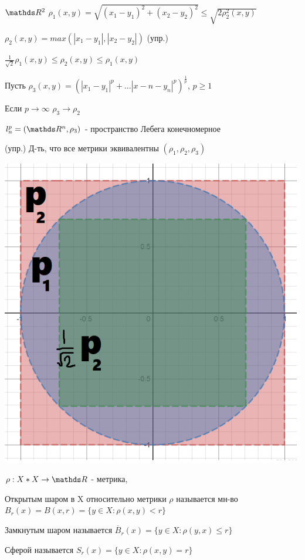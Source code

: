\documentclass[11pt]{article}
\begin{document}
\begin{instance}
    $\R^2$ $\rho_1(x,y) = \sqrt{(x_1-y_1)^2 + (x_2-y_2)^2} \leqslant \sqrt{2 \rho_2^2(x,y)}$
    
    $\rho_2(x,y)=max(|x_1-y_1|, |x_2-y_2|)$ (упр.)
    
    $\frac{1}{\sqrt{2}} \rho_1(x,y) \leqslant \rho_2(x,y) \leqslant \rho_1(x,y)$
    
    Пусть $\rho_3(x,y)=(|x_1-y_1|^p+...|x-n-y_n|^p)^{\frac{1}{p}}$, $p \geqslant 1$
    
    Если $p \rightarrow \infty$ $\rho_3 \rightarrow \rho_2$
    
    $l_n^p=(\R^n,\rho_3)$ - пространство Лебега конечномерное
    
    (упр.) Д-ть, что все метрики эквивалентны $(\rho_1,\rho_2,\rho_3)$
\end{instance}
\includegraphics[scale=0.3]{pictures/p1p2p3.png}

\begin{definition}
    $\rho: X*X \rightarrow \R$ - метрика, 
    
    Открытым шаром в X относительно метрики $\rho$ называется мн-во $B_r(x)=B(x,r)=\{y \in X: \rho(x,y) < r \}$
    
    Замкнутым шаром называется $\overline{B}_r(x)=\{y \in X: \rho(y,x) \leqslant r \}$
    
    Сферой называется $S_r(x)=\{y \in X: \rho(x,y)=r \}$
\end{definition}
\end{document}
